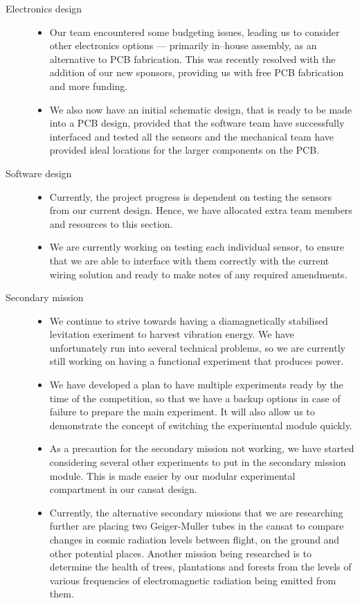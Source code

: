 \documentclass{report}
\begin{document}
\begin{description}
		\item[Electronics design] \hfill \begin{itemize}
			\item Our team encountered some budgeting issues, leading us to
			consider other electronics options --- primarily in--house 
			assembly, as an alternative to PCB fabrication. This was recently
			resolved with the addition of our new sponsors, providing us
			with free PCB fabrication and more funding.
			\item We also now have an initial schematic design, that is 
			ready to be made into a PCB design, provided that the software
			team have successfully interfaced and tested all the sensors and
			the mechanical team have provided ideal locations for the larger
			components on the PCB.
		\end{itemize}

		\item[Software design] \hfill \begin{itemize}
			\item Currently, the project progress is dependent on 
			testing the sensors from our current design.
			Hence, we have allocated extra team members and 
			resources to this section.
			\item We are currently working on testing each individual sensor, 
			to ensure that we are able to interface with them correctly with
			the current wiring solution and ready to make notes of any required 
			amendments.
		\end{itemize}

		\item[Secondary mission] \hfill \begin{itemize}
			\item We continue to strive towards having a diamagnetically 
			stabilised levitation exeriment to harvest vibration energy. We have
			unfortunately run into several technical problems, so we are currently
			still working on having a functional experiment that produces power.
			\item We have developed a plan to have multiple experiments ready
			by the time of the competition, so that we have a backup options
			in case of failure to prepare the main experiment. It will also allow
			us to demonstrate the concept of switching the experimental module 
			quickly.
			\item As a precaution for the secondary mission not working, we 
			have started considering several other experiments to put in the
			secondary mission module. This is made easier by our modular
			experimental compartment in our cansat design.
			\item Currently, the alternative secondary missions that we are researching
			further are placing two Geiger-Muller tubes in the cansat to compare
			changes in cosmic radiation levels between flight, on the ground and
			other potential places. Another mission being researched is to determine
			the health of trees, plantations and forests from the levels of various 
			frequencies of electromagnetic radiation being emitted from them.
		\end{itemize}


\end{description}
\end{document}
